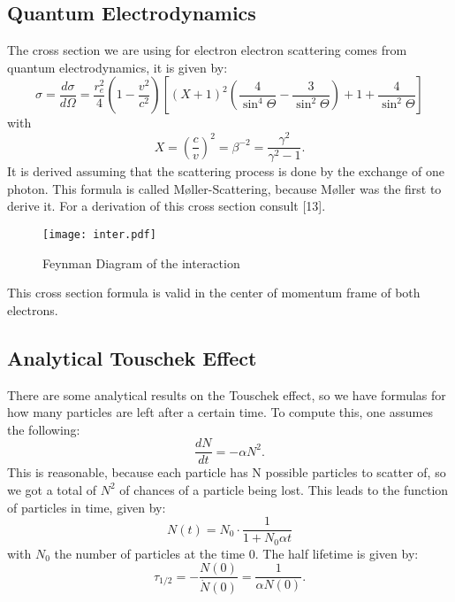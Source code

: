 \subsection{Quantum Electrodynamics}
The cross section we are using for electron electron scattering comes from quantum electrodynamics, it is given by:
\begin{equation} \sigma = \frac{d\sigma}{d\Omega} = \frac{r_e ^2}{4} \left(1 - \frac{v^2}{c^2}\right) \left[ (X+1)^2 \left(\frac 4 {\sin^4 \Theta} - \frac 3 {\sin^2 \Theta}\right) + 1 + \frac 4 {\sin^2 \Theta}\right] \end{equation}
with
\begin{equation} X = \left(\frac c v\right)^2 = \beta^{-2} = \frac{\gamma^2}{\gamma^2 - 1}. \end{equation}
It is derived assuming that the scattering process is done by the exchange of one photon. This formula is called M{\o}ller-Scattering, because M{\o}ller was the first to derive it. For a derivation of this cross section consult [13].

\begin{figure}[here]
 \centering
 \texttt{[image: inter.pdf]}
 \caption{Feynman Diagram of the interaction}
\end{figure}


This cross section formula is valid in the center of momentum frame of both electrons.

\subsection{Analytical Touschek Effect}
There are some analytical results on the Touschek effect, so we have formulas for how many particles are left after a certain time. To compute this, one assumes the following:
\begin{equation}\frac{dN}{dt} = - \alpha N^2. \end{equation}
This is reasonable, because each particle has N possible particles to scatter of, so we got a total of $N^2$ of chances of a particle being lost. This leads to the function of particles in time, given by:
\begin{equation} N(t) = N_0 \cdot \frac 1 {1 + N_0 \alpha t} \end{equation}
with $N_0$ the number of particles at the time 0. The half lifetime is given by:
\begin{equation}\tau_{1/2} = - \frac{N(0)}{\dot N(0)} = \frac 1 {\alpha N(0)}. \end{equation}
